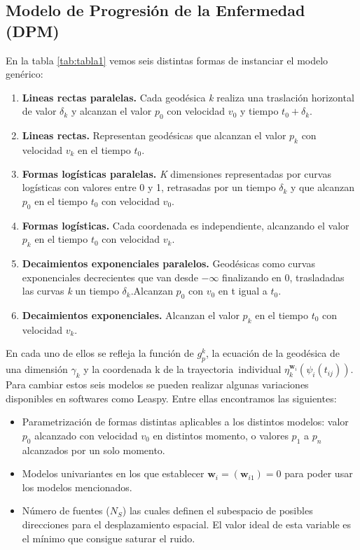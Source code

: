 \documentclass[12pt]{article}
\begin{document}
\subsection{Modelo de Progresión de la Enfermedad (DPM)}
En la tabla \ref{tab:tabla1} vemos seis distintas formas de instanciar el modelo genérico: 
\begin{enumerate}
	\item \textbf{Lineas rectas paralelas.} Cada geodésica \textit{k} realiza una traslación horizontal de valor $\delta_{k}$ y alcanzan el valor $p_{0}$ con velocidad $v_{0}$ y tiempo $t_{0}+\delta_{k}$.
	\item\textbf{ Lineas rectas.} Representan geodésicas que alcanzan el valor $p_{k}$ con velocidad $v_{k}$ en el tiempo $t_{0}$.
	\item \textbf{Formas logísticas paralelas.} \textit{K} dimensiones representadas por curvas logísticas con valores entre 0 y 1, retrasadas por un tiempo $\delta_{k}$ y que alcanzan $p_{0}$ en el tiempo $t_{0}$ con velocidad $v_{0}$.
	\item \textbf{Formas logísticas.} Cada coordenada es independiente, alcanzando el valor $p_{k}$ en el tiempo $t_{0}$ con velocidad $v_{k}$.
	\item \textbf{Decaimientos exponenciales paralelos.} Geodésicas como curvas exponenciales decrecientes que van desde $-\infty$ finalizando en 0, trasladadas las curvas \textit{k} un tiempo $\delta_{k}$.Alcanzan $p_{0}$ con $v_{0}$ en t igual a $t_{0}$.
	\item \textbf{Decaimientos exponenciales.} Alcanzan el valor $p_{k}$ en el tiempo $t_{0}$ con velocidad $v_{k}$.
\end{enumerate}

En cada uno de ellos se refleja la función de $g_{p}^{k}$, la ecuación de la geodésica de una dimensión $\gamma_{k}$  y la coordenada k de la trayectoria individual $\eta_{k}^{\textbf{w}_{i}}(\psi_{i}(t_{ij}))$. \\

Para cambiar estos seis modelos se pueden realizar algunas variaciones disponibles en softwares como Leaspy. Entre ellas encontramos las siguientes:
\begin{itemize}
	\item Parametrización de formas distintas aplicables a los distintos modelos: valor $p_{0}$ alcanzado con velocidad $v_{0}$ en distintos momento, o valores $p_{1}$ a $p_{n}$ alcanzados por un solo momento.
	\item Modelos univariantes en los que establecer $\textbf{w}_{i}=(\textbf{w}_{i1})=0$ para poder usar los modelos mencionados.
	\item Número de fuentes ($\textit{N}_{S}$) las cuales definen el subespacio de posibles direcciones para el desplazamiento espacial. El valor ideal de esta variable es el mínimo que consigue saturar el ruido.
\end{itemize}
\end{document}

